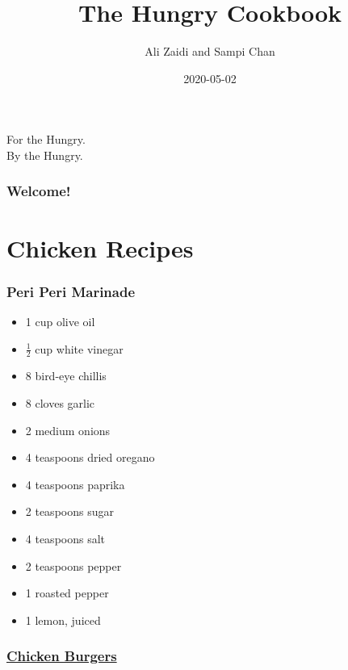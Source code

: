 \documentclass[
]{article}
\title{The Hungry Cookbook}
\author{Ali Zaidi and Sampi Chan}
\date{2020-05-02}
\providecommand{\tightlist}{%
  \setlength{\itemsep}{0pt}\setlength{\parskip}{0pt}}
\begin{document}
\maketitle


\begin{center}
For the Hungry. \\
By the Hungry.

\end{center}


{
\setcounter{tocdepth}{2}
\tableofcontents
}
\hypertarget{welcome}{%
\section*{Welcome!}\label{welcome}}

\hypertarget{part-chicken-recipes}{%
\part{Chicken Recipes}\label{part-chicken-recipes}}

\hypertarget{peri-peri-marinade}{%
\section{Peri Peri Marinade}\label{peri-peri-marinade}}

\begin{itemize}
\tightlist
\item
  1 cup olive oil
\item
  \(\frac{1}{2}\) cup white vinegar
\item
  8 bird-eye chillis
\item
  8 cloves garlic
\item
  2 medium onions
\item
  4 teaspoons dried oregano
\item
  4 teaspoons paprika
\item
  2 teaspoons sugar
\item
  4 teaspoons salt
\item
  2 teaspoons pepper
\item
  1 roasted pepper
\item
  1 lemon, juiced
\end{itemize}

\hypertarget{chicken-burgers}{%
\section{\texorpdfstring{\href{https://www.foodnetwork.com/recipes/rachael-ray/bbq-chicken-burgers-with-slaw-recipe-1917239}{Chicken Burgers}}{Chicken Burgers}}\label{chicken-burgers}}
\end{document}

